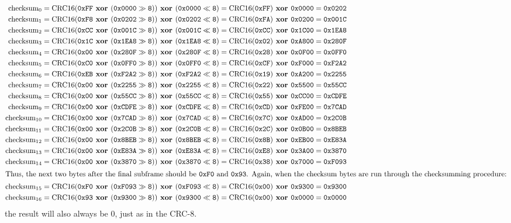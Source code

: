 {
\begin{align*}
\CRCSIXTEEN{0}{0xFF}{0x0000}{0xFF}{0x0000}{0x0202} \\
\CRCSIXTEEN{1}{0xF8}{0x0202}{0xFA}{0x0200}{0x001C} \\
\CRCSIXTEEN{2}{0xCC}{0x001C}{0xCC}{0x1C00}{0x1EA8} \\
\CRCSIXTEEN{3}{0x1C}{0x1EA8}{0x02}{0xA800}{0x280F} \\
\CRCSIXTEEN{4}{0x00}{0x280F}{0x28}{0x0F00}{0x0FF0} \\
\CRCSIXTEEN{5}{0xC0}{0x0FF0}{0xCF}{0xF000}{0xF2A2} \\
\CRCSIXTEEN{6}{0xEB}{0xF2A2}{0x19}{0xA200}{0x2255} \\
\CRCSIXTEEN{7}{0x00}{0x2255}{0x22}{0x5500}{0x55CC} \\
\CRCSIXTEEN{8}{0x00}{0x55CC}{0x55}{0xCC00}{0xCDFE} \\
\CRCSIXTEEN{9}{0x00}{0xCDFE}{0xCD}{0xFE00}{0x7CAD} \\
\CRCSIXTEEN{10}{0x00}{0x7CAD}{0x7C}{0xAD00}{0x2C0B} \\
\CRCSIXTEEN{11}{0x00}{0x2C0B}{0x2C}{0x0B00}{0x8BEB} \\
\CRCSIXTEEN{12}{0x00}{0x8BEB}{0x8B}{0xEB00}{0xE83A} \\
\CRCSIXTEEN{13}{0x00}{0xE83A}{0xE8}{0x3A00}{0x3870} \\
\CRCSIXTEEN{14}{0x00}{0x3870}{0x38}{0x7000}{0xF093} \\
\intertext{Thus, the next two bytes after the final subframe should be
\texttt{0xF0} and \texttt{0x93}.
Again, when the checksum bytes are run through the checksumming procedure:}
\CRCSIXTEEN{15}{0xF0}{0xF093}{0x00}{0x9300}{0x9300} \\
\CRCSIXTEEN{16}{0x93}{0x9300}{0x00}{0x0000}{0x0000}
\end{align*}
the result will also always be 0, just as in the CRC-8.
}
